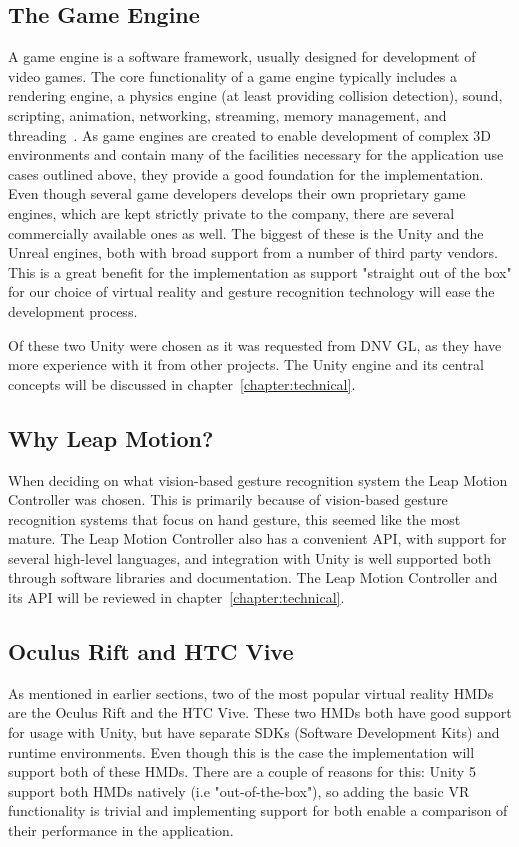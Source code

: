 \subsection{The Game Engine}
A game engine is a software framework, usually designed for development of video games. 
The core functionality of a game engine typically includes a rendering engine, a physics engine (at least providing collision detection), sound, scripting, 
animation, networking, streaming, memory management, and threading~\citep{Gregory2014}. As game engines are created to enable development of complex 
3D environments and contain many of the facilities necessary for the application use cases outlined above, they provide a good foundation for the implementation.
Even though several game developers develops their own proprietary game engines, which are kept strictly private to the company, there are several commercially available ones 
as well. The biggest of these is the Unity and the Unreal engines, both with broad support from a number of third party vendors. This is a great benefit for the implementation 
as support "straight out of the box" for our choice of virtual reality and gesture recognition technology will ease the development process.

Of these two Unity were chosen as it was requested from DNV GL, as they have more experience with it from other projects.
The Unity engine and its central concepts will be discussed in chapter~\vref{chapter:technical}.

\subsection{Why Leap Motion?}
When deciding on what vision-based gesture recognition system the Leap Motion Controller was chosen.
This is primarily because of vision-based gesture recognition systems that focus on hand gesture, this seemed like the most mature. 
The Leap Motion Controller also has a convenient API, with support for several high-level languages, and integration with Unity is well supported both
through software libraries and documentation. The Leap Motion Controller and its API will be reviewed in chapter~\vref{chapter:technical}.

\subsection{Oculus Rift and HTC Vive}
As mentioned in earlier sections, two of the most popular virtual reality HMDs are the Oculus Rift and the HTC Vive. 
These two HMDs both have good support for usage with Unity, but have separate SDKs (Software Development Kits) and runtime environments.
Even though this is the case the implementation will support both of these HMDs. There are a couple of reasons for this:
Unity 5 support both HMDs natively (i.e "out-of-the-box"), so adding the basic VR functionality is trivial and 
implementing support for both enable a comparison of their performance in the application. 



